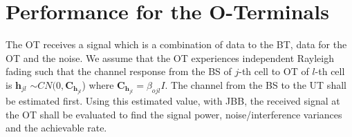 \documentclass[10pt, a4paper, twoside,fleqn]{article}
\begin{document}

\section{Performance for the O-Terminals}
	The OT receives a signal which is a combination of data to the BT, data for the OT and the noise. We assume that the OT experiences independent Rayleigh fading such that the channel response from the BS of $j$-th cell to OT of $l$-th cell is $\pmb{h}_{jl}$ $\sim CN(0,\pmb{C}_{\pmb{h}_{jl}}$) where $\pmb{C}_{\pmb{h}_{jl}} = \beta_{ojl}I$. The channel from the BS to the UT shall be estimated first. Using this estimated value, with JBB, the received signal at the OT shall be evaluated to find the signal power, noise/interference variances and the achievable rate.
\end{document}
